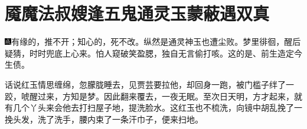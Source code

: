 

\chapter{魇魔法叔嫂逢五鬼\hspace{.5em}通灵玉蒙蔽遇双真}

{\includegraphics[width=3mm]{../Images/00005}有缘的，推不开；知心的，死不改。纵然是通灵神玉也遭尘败。梦里徘徊，醒后疑猜，时时兜底上心来。怕人窥破笑盈腮，独自无言偷打咳。这的是、前生造定今生债。}

话说红玉情思缠绵，忽朦胧睡去，见贾芸要拉他，却回身一跑，被门槛子绊了一跤，唬醒过来，方知是梦。因此翻来覆去，一夜无眠。至次日天明，方才起来，就有几个丫头来会他去打扫屋子地，提洗脸水。这红玉也不梳洗，向镜中胡乱挽了一挽头发，洗了洗手，腰内束了一条汗巾子，便来扫地。

